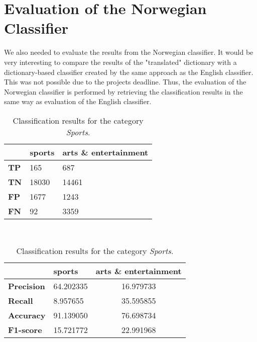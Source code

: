 \section{Evaluation of the Norwegian Classifier}
We also needed to evaluate the results from the Norwegian classifier. It would be very interesting to compare the results of the "translated" dictionary with a dictionary-based classifier created by the same approach as the English classifier. This was not possible due to the projects deadline. Thus, the evaluation of the Norwegian classifier is performed by retrieving the classification results in the same way as evaluation of the English classifier. 


\begin{table}[h]
\centering
\renewcommand{\arraystretch}{1.25}
\begin{tabular}{l |l|l}
         & {\bf sports} & {\bf arts \& entertainment} \\ \hline
{\bf TP} & 165          & 687                         \\ \hline
{\bf TN} & 18030        & 14461                       \\ \hline
{\bf FP} & 1677         & 1243                        \\ \hline
{\bf FN} & 92           & 3359                        \\
\end{tabular}
\\[10pt]
\caption{Classification results for the category \emph{Sports}.}
\label{tab:results_norwegian}
\end{table}



\begin{table}[h]
\centering
\renewcommand{\arraystretch}{1.25}
\begin{tabular}{l |l|c}
                & {\bf sports} & \multicolumn{1}{l|}{{\bf arts \& entertainment}} \\ \hline
{\bf Precision} & 64.202335    & 16.979733                                        \\ \hline
{\bf Recall}    & 8.957655     & 35.595855                                        \\ \hline
{\bf Accuracy}  & 91.139050    & 76.698734                                        \\ \hline
{\bf F1-score}  & 15.721772    & 22.991968                                        \\
\end{tabular}
\\[10pt]
\caption{Classification results for the category \emph{Sports}.}
\label{tab:evaluation_norwegian}
\end{table}

